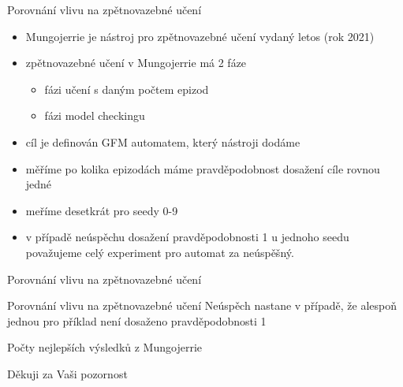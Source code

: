 \documentclass[
]{beamer}
\begin{document}
	
\begin{frame}{Porovnání vlivu na zpětnovazebné učení}
	\begin{itemize}
		\pause
		\item \alert{Mungojerrie} je nástroj pro zpětnovazebné učení vydaný letos (rok 2021)\pause
		\item zpětnovazebné učení v Mungojerrie má 2 fáze\pause
		\begin{itemize}
			\item fázi učení s daným počtem epizod
			\item fázi model checkingu
		\end{itemize}\pause
		\item \alert{cíl je definován GFM automatem}, který nástroji dodáme\pause
		\item měříme po kolika epizodách máme pravděpodobnost dosažení cíle rovnou jedné\pause
		\item meříme desetkrát pro seedy 0-9\pause
		\item v případě neúspěchu dosažení pravděpodobnosti 1 u jednoho seedu považujeme celý experiment pro automat za neúspěšný.
	\end{itemize}
		
\end{frame}
\begin{frame}{Porovnání vlivu na zpětnovazebné učení}
	


\end{frame}
\begin{frame}{Porovnání vlivu na zpětnovazebné učení}
	Neúspěch nastane v případě, že alespoň jednou pro příklad není dosaženo pravděpodobnosti 1
	\begin{table}[ht]
		\centering
		
		\caption{Počty nejlepších výsledků z Mungojerrie }
		\label{Table:mungostatsnoex}
		
	\end{table}
\end{frame}

\begin{frame}[plain]
	\vfill
	\centerline{Děkuji za Vaši pozornost}
	\vfill\vfill
\end{frame}
\end{document}
